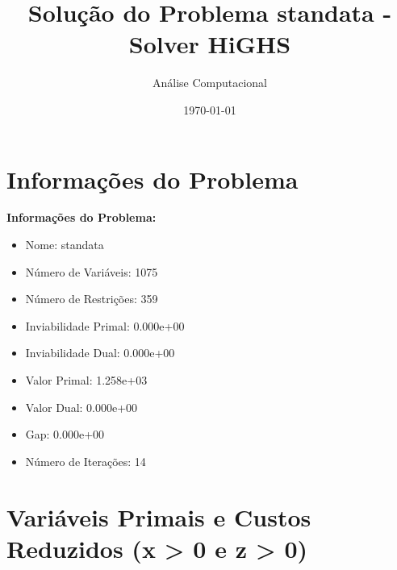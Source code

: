 \documentclass[12pt]{article}
\title{Solução do Problema standata - Solver HiGHS}
\author{Análise Computacional}
\date{\today}
\begin{document}
\maketitle

\section{Informações do Problema}

\textbf{Informações do Problema:}
\begin{itemize}
\item Nome: standata
\item Número de Variáveis: 1075
\item Número de Restrições: 359
\item Inviabilidade Primal: 0.000e+00
\item Inviabilidade Dual: 0.000e+00
\item Valor Primal: 1.258e+03
\item Valor Dual: 0.000e+00
\item Gap: 0.000e+00
\item Número de Iterações: 14
\end{itemize}


\section{Variáveis Primais e Custos Reduzidos (x > 0 e z > 0)}
\end{document}
